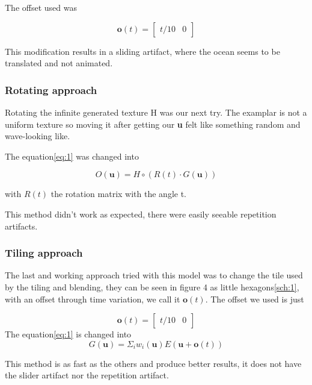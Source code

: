\documentclass{article}
\begin{document}
The offset used was 

\begin{equation}
    \textbf{o}(t) = \begin{bmatrix} t/10 & 0\end{bmatrix}
\end{equation}

This modification results in a sliding artifact, where the ocean seems to be translated and not animated.

\subsubsection{Rotating approach}

Rotating the infinite generated texture H was our next try. The examplar is not a uniform texture so moving it after getting our \textbf{u} felt like something random and wave-looking like.

The equation\ref{eq:1} was changed into 

\begin{equation}
    O(\textbf{u})=H\circ (R(t)\cdot G(\textbf{u}))
\end{equation}

with $R(t)$ the rotation matrix with the angle t.

This method didn't work as expected, there were easily seeable repetition artifacts.

\subsubsection{Tiling approach}
The last and working approach tried with this model was to change the tile used by the tiling and blending, they can be seen in figure 4 as little hexagons\ref{sch:1}, with an offset through time variation, we call it $\textbf{o}(t)$.
The offset we used is just

\begin{equation} \label{eq:3}
\textbf{o}(t) = \begin{bmatrix} t/10 & 0\end{bmatrix}
\end{equation}
The equation\ref{eq:1} is changed into
\begin{equation} \label{eq:4}
G(\textbf{u}) = \Sigma_i{w_i(\textbf{u})E(\textbf{u}+\textbf{o}(t))}
\end{equation}

This method is as fast as the others and produce better results, it does not have the slider artifact nor the repetition artifact.
\end{document}
